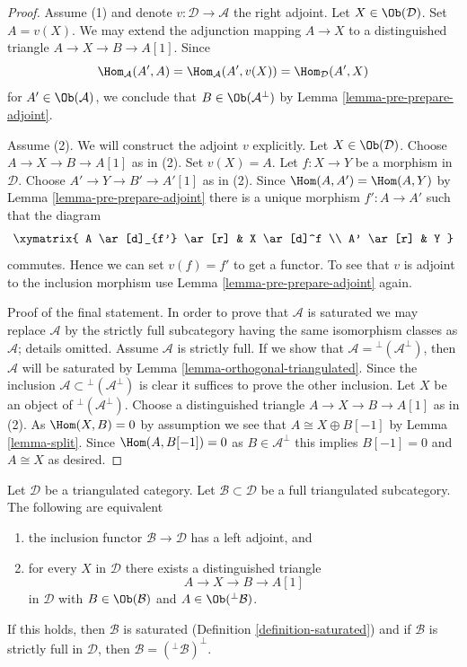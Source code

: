 \begin{proof}
Assume (1) and denote $v : \mathcal{D} \to \mathcal{A}$ the right adjoint.
Let $X \in \Ob(\mathcal{D})$. Set $A = v(X)$. We may extend the
adjunction mapping $A \to X$ to a distinguished triangle
$A \to X \to B \to A[1]$. Since
$$
\Hom_\mathcal{A}(A', A) =
\Hom_\mathcal{A}(A', v(X)) =
\Hom_\mathcal{D}(A', X)
$$
for $A' \in \Ob(\mathcal{A})$, we conclude that $B \in \Ob(\mathcal{A}^\perp)$
by Lemma \ref{lemma-pre-prepare-adjoint}.

\medskip\noindent
Assume (2). We will construct the adjoint $v$ explicitly.
Let $X \in \Ob(\mathcal{D})$. Choose $A \to X \to B \to A[1]$ as in (2).
Set $v(X) = A$. Let $f : X \to Y$ be a morphism in $\mathcal{D}$.
Choose $A' \to Y \to B' \to A'[1]$ as in (2). Since
$\Hom(A, A') = \Hom(A, Y)$ by Lemma \ref{lemma-pre-prepare-adjoint}
there is a unique morphism $f' : A \to A'$ such that the diagram
$$
\xymatrix{
A \ar[d]_{f'} \ar[r] & X \ar[d]^f \\
A' \ar[r] & Y
}
$$
commutes. Hence we can set $v(f) = f'$ to get a functor.
To see that $v$ is adjoint to the inclusion morphism use
Lemma \ref{lemma-pre-prepare-adjoint} again.

\medskip\noindent
Proof of the final statement. In order to prove that $\mathcal{A}$
is saturated we may replace $\mathcal{A}$ by the strictly full
subcategory having the same isomorphism classes as $\mathcal{A}$;
details omitted. Assume $\mathcal{A}$ is strictly full. If we show that
$\mathcal{A} = {}^\perp(\mathcal{A}^\perp)$, then
$\mathcal{A}$ will be saturated by Lemma \ref{lemma-orthogonal-triangulated}.
Since the inclusion $\mathcal{A} \subset {}^\perp(\mathcal{A}^\perp)$
is clear it suffices to prove the other inclusion.
Let $X$ be an object of ${}^\perp(\mathcal{A}^\perp)$.
Choose a distinguished triangle $A \to X \to B \to A[1]$
as in (2). As $\Hom(X, B) = 0$ by assumption we see that
$A \cong X \oplus B[-1]$ by Lemma \ref{lemma-split}.
Since $\Hom(A, B[-1]) = 0$ as $B \in \mathcal{A}^\perp$
this implies $B[-1] = 0$ and $A \cong X$ as desired.
\end{proof}

\begin{lemma}
\label{lemma-left-adjoint}
Let $\mathcal{D}$ be a triangulated category. Let
$\mathcal{B} \subset \mathcal{D}$ be a full triangulated subcategory.
The following are equivalent
\begin{enumerate}
\item the inclusion functor $\mathcal{B} \to \mathcal{D}$
has a left adjoint, and
\item for every $X$ in $\mathcal{D}$ there exists a distinguished
triangle
$$
A \to X \to B \to A[1]
$$
in $\mathcal{D}$ with $B \in \Ob(\mathcal{B})$ and
$A \in \Ob({}^\perp\mathcal{B})$.
\end{enumerate}
If this holds, then $\mathcal{B}$ is saturated
(Definition \ref{definition-saturated}) and if $\mathcal{B}$
is strictly full in $\mathcal{D}$, then
$\mathcal{B} = ({}^\perp\mathcal{B})^\perp$.
\end{lemma}

